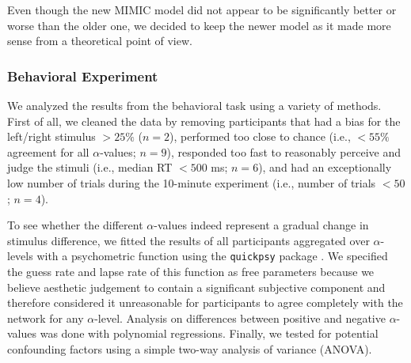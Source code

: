\documentclass[../main.tex]{subfiles}
\begin{document}
	Even though the new MIMIC model did not appear to be significantly better or worse than the older one, we decided to keep the newer model as it made more sense from a theoretical point of view.
	
	
	
	\subsubsection{Behavioral Experiment}
	We analyzed the results from the behavioral task using a variety of methods. First of all, we cleaned the data by removing participants that had a bias for the left/right stimulus $>25\%$ ($n=2$), performed too close to chance (i.e., $<55\%$ agreement for all $\alpha$-values; $n=9$), responded too fast to reasonably perceive and judge the stimuli (i.e., median RT $<500$ ms; $n=6$), and had an exceptionally low number of trials during the 10-minute experiment (i.e., number of trials $<50$; $n=4$).
	
	To see whether the different $\alpha$-values indeed represent a gradual change in stimulus difference, we fitted the results of all participants aggregated over $\alpha$-levels with a psychometric function using the \texttt{quickpsy} package \parencite{linares2016quickpsy}. We specified the guess rate and lapse rate of this function as free parameters because we believe aesthetic judgement to contain a significant subjective component and therefore considered it unreasonable for participants to agree completely with the network for any $\alpha$-level. Analysis on differences between positive and negative $\alpha$-values was done with polynomial regressions. Finally, we tested for potential confounding factors using a simple two-way analysis of variance (ANOVA).
	
	
	
\end{document}
